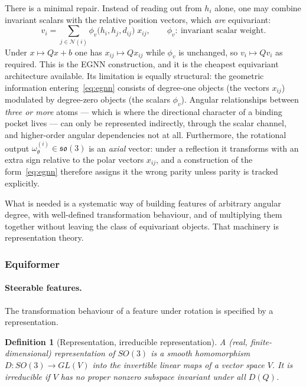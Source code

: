 \documentclass[a4paper,12pt]{article}
\newtheorem{definition}[theorem]{Definition}
\theoremstyle{remark}
\begin{document}
There is a minimal repair. Instead of reading out from $h_i$ alone, one may combine
invariant scalars with the relative position vectors, which \emph{are} equivariant:
\begin{equation}
\label{eq:egnn}
v_i
=
\sum_{j\in\mathcal N(i)}
\phi_v\bigl(h_i,h_j,d_{ij}\bigr)\;x_{ij},
\qquad
\phi_v:\ \text{invariant scalar weight} .
\end{equation}
Under $x\mapsto Qx+b$ one has $x_{ij}\mapsto Qx_{ij}$ while $\phi_v$ is unchanged, so
$v_i\mapsto Qv_i$ as required. This is the EGNN construction, and it is the cheapest
equivariant architecture available. Its limitation is equally structural: the geometric
information entering~\eqref{eq:egnn} consists of degree-one objects (the vectors
$x_{ij}$) modulated by degree-zero objects (the scalars $\phi_v$). Angular relationships
between \emph{three or more} atoms --- which is where the directional character of a
binding pocket lives --- can only be represented indirectly, through the scalar channel,
and higher-order angular dependencies not at all. Furthermore, the rotational output
$\omega^{(i)}_\theta\in\mathfrak{so}(3)$ is an \emph{axial} vector: under a reflection it
transforms with an extra sign relative to the polar vectors $x_{ij}$, and a construction
of the form~\eqref{eq:egnn} therefore assigns it the wrong parity unless parity is
tracked explicitly.

What is needed is a systematic way of building features of arbitrary angular degree,
with well-defined transformation behaviour, and of multiplying them together without
leaving the class of equivariant objects. That machinery is representation theory.

\subsubsection{Equiformer}
\label{sec:equiformer}

\paragraph{Steerable features.}
The transformation behaviour of a feature under rotation is specified by a
representation.

\begin{definition}[Representation, irreducible representation]
\label{def:representation}
A (real, finite-dimensional) \emph{representation} of $SO(3)$ is a smooth homomorphism
$D:SO(3)\to GL(V)$ into the invertible linear maps of a vector space $V$. It is
\emph{irreducible} if $V$ has no proper nonzero subspace invariant under all $D(Q)$.
\end{definition}
\end{document}
